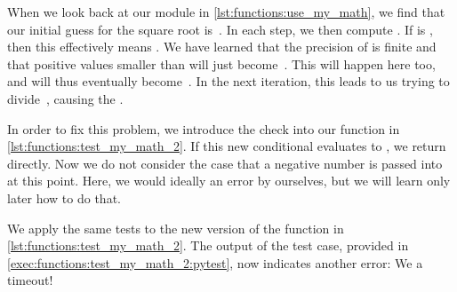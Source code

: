 When we look back at our  module in \cref{lst:functions:use_my_math}, we find that our initial guess for the square root is~.
In each step, we then compute .
If  is , then this effectively means .
We have learned that the precision of  is finite and that positive values smaller than  will just become~.
This will happen here too, and  will thus eventually become~.
In the next iteration, this leads to us trying to divide~, causing the .
%
\FloatBarrier%
%
%
%
%

In order to fix this problem, we introduce the check  into our  function in \cref{lst:functions:test_my_math_2}.
If this new conditional evaluates to , we return~ directly.
Now we do not consider the case that a negative number is passed into  at this point.
Here, we would ideally  an error by ourselves, but we will learn only later how to do that.

We apply the same tests to the new version of the  function in \cref{lst:functions:test_my_math_2}.
The output of the test case, provided in \cref{exec:functions:test_my_math_2:pytest}, now indicates another error:
We a timeout!

